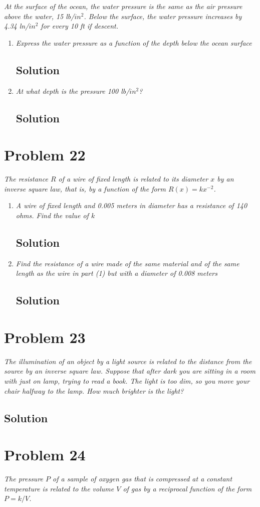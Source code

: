 \documentclass[11pt]{article}
\newcommand{\soln}{\subsection*}
\newcommand{\qn}{\textit}
\begin{document}
\qn{At the surface of the ocean, the water pressure is the same as the air pressure above the water, 15 lb/$in^2$. Below the surface, the water pressure increases by 4.34 ln/$in^2$ for every 10 ft if descent.}

\begin{enumerate}
	\item \qn{Express the water pressure as a function of the depth below the ocean surface}
	\soln{Solution}
	
	\item \qn{At what depth is the pressure 100 lb/$in^2$?}
	\soln{Solution}
\end{enumerate}

\section*{Problem 22}

\qn{The resistance $R$ of a wire of fixed length is related to its diameter $x$ by an inverse square law, that is, by a function of the form $R(x)=kx^{-2}$.}

\begin{enumerate}
	\item \qn{A wire of fixed length and 0.005 meters in diameter has a resistance of 140 ohms. Find the value of $k$}
	\soln{Solution}
	
	\item \qn{Find the resistance of a wire made of the same material and of the same length as the wire in part (1) but with a diameter of 0.008 meters}
	\soln{Solution}
\end{enumerate}

\section*{Problem 23}

\qn{The illumination of an object by a light source is related to the distance from the source by an inverse square law. Suppose that after dark you are sitting in a room with just on lamp, trying to read a book. The light is too dim, so you move your chair halfway to the lamp. How much brighter is the light?}

\soln{Solution}

\section*{Problem 24}

\qn{The pressure $P$ of a sample of oxygen gas that is compressed at a constant temperature is related to the volume $V$ of gas by a reciprocal function of the form $P=k/V$.}
\end{document}
